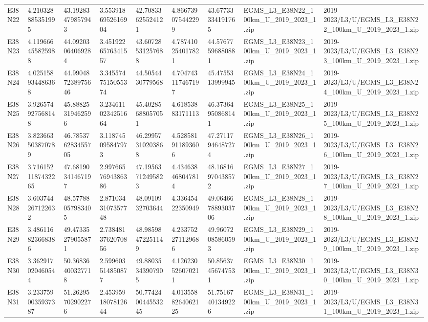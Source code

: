 \begin{landscape}
\begin{longtable}{lllllllll}
E38N22 & 4.210328885351995 & 43.19283479857943 & 3.5539186952616904 & 42.70833625524121 & 4.866739075442299 & 43.67733334191765 & EGMS\_L3\_E38N22\_100km\_U\_2019\_2023\_1.zip & 2019-2023/L3/U/EGMS\_L3\_E38N22\_100km\_U\_2019\_2023\_1.zip \\
E38N23 & 4.119666455825988 & 44.09203064069284 & 3.4519226576341557 & 43.60728531257688 & 4.787410254017821 & 44.57677596880881 & EGMS\_L3\_E38N23\_100km\_U\_2019\_2023\_1.zip & 2019-2023/L3/U/EGMS\_L3\_E38N23\_100km\_U\_2019\_2023\_1.zip \\
E38N24 & 4.025158934486368 & 44.990487238975646 & 3.3455747515055374 & 44.5054430779568 & 4.704743117467197 & 45.4755313999945 & EGMS\_L3\_E38N24\_100km\_U\_2019\_2023\_1.zip & 2019-2023/L3/U/EGMS\_L3\_E38N24\_100km\_U\_2019\_2023\_1.zip \\
E38N25 & 3.926574927568148 & 45.88825319462596 & 3.2346110234251664 & 45.40285688057051 & 4.61853883171113 & 46.37364950868141 & EGMS\_L3\_E38N25\_100km\_U\_2019\_2023\_1.zip & 2019-2023/L3/U/EGMS\_L3\_E38N25\_100km\_U\_2019\_2023\_1.zip \\
E38N26 & 3.823663503870789 & 46.785376283455705 & 3.118745095847973 & 46.29957310203868 & 4.528581911893606 & 47.27117946487274 & EGMS\_L3\_E38N26\_100km\_U\_2019\_2023\_1.zip & 2019-2023/L3/U/EGMS\_L3\_E38N26\_100km\_U\_2019\_2023\_1.zip \\
E38N27 & 3.7161521187432265 & 47.68190341467197 & 2.9976657694386386 & 47.19563712495823 & 4.434638468047814 & 48.16816970438572 & EGMS\_L3\_E38N27\_100km\_U\_2019\_2023\_1.zip & 2019-2023/L3/U/EGMS\_L3\_E38N27\_100km\_U\_2019\_2023\_1.zip \\
E38N28 & 3.603744267122632 & 48.57788057983405 & 2.8710343107357748 & 48.0910932703644 & 4.33645422350949 & 49.064667889303706 & EGMS\_L3\_E38N28\_100km\_U\_2019\_2023\_1.zip & 2019-2023/L3/U/EGMS\_L3\_E38N28\_100km\_U\_2019\_2023\_1.zip \\
E38N29 & 3.486116823668386 & 49.47335279055871 & 2.7384813762070856 & 48.98598472251149 & 4.233752271129686 & 49.96072085860593 & EGMS\_L3\_E38N29\_100km\_U\_2019\_2023\_1.zip & 2019-2023/L3/U/EGMS\_L3\_E38N29\_100km\_U\_2019\_2023\_1.zip \\
E38N30 & 3.362917020460544 & 50.36836400327718 & 2.599603514850877 & 49.88035343907905 & 4.126230526070211 & 50.85637456747531 & EGMS\_L3\_E38N30\_100km\_U\_2019\_2023\_1.zip & 2019-2023/L3/U/EGMS\_L3\_E38N30\_100km\_U\_2019\_2023\_1.zip \\
E38N31 & 3.2337590035937387 & 51.26295702902276 & 2.4539591807812644 & 50.774240044553245 & 4.0135588264062125 & 51.75167401349226 & EGMS\_L3\_E38N31\_100km\_U\_2019\_2023\_1.zip & 2019-2023/L3/U/EGMS\_L3\_E38N31\_100km\_U\_2019\_2023\_1.zip \\

\end{longtable}
\end{landscape}
